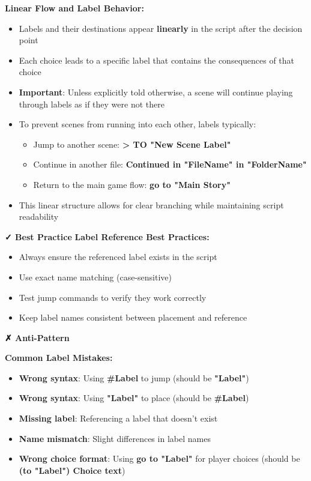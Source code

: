 \documentclass[11pt,letterpaper,oldstylefigures]{memoir}
\newenvironment{AntiPattern}
{\begingroup
\small
\setlength{\parindent}{0pt}
\setlength{\parskip}{0.5em}
\allowdisplaybreaks
\setlength{\displaywidowpenalty}{0}
\setlength{\widowpenalty}{0}
\setlength{\clubpenalty}{0}
\setlength{\interlinepenalty}{0}
\begin{tcolorbox}[
    colback=red!5,
    colframe=red!75!black,
    boxrule=0.5pt,
    arc=2pt,
    left=0.5em,
    right=0.5em,
    top=0.25em,
    bottom=0.25em
]
\textbf{✗ Anti-Pattern}
\end{tcolorbox}\par
}
{\endgroup}
\newcommand{\fountain}[1]{\textbf{#1}}
\begin{document}
\textbf{Linear Flow and Label Behavior:}
\begin{itemize}
\item Labels and their destinations appear \textbf{linearly} in the script after the decision point
\item Each choice leads to a specific label that contains the consequences of that choice
\item \textbf{Important}: Unless explicitly told otherwise, a scene will continue playing through labels as if they were not there
\item To prevent scenes from running into each other, labels typically:
  \begin{itemize}
  \item Jump to another scene: \fountain{> TO "New Scene Label"}
  \item Continue in another file: \fountain{Continued in "FileName" in "FolderName"}
  \item Return to the main game flow: \fountain{go to "Main Story"}
  \end{itemize}
\item This linear structure allows for clear branching while maintaining script readability
\end{itemize}

\textbf{✓ Best Practice}
\textbf{Label Reference Best Practices:}
\begin{itemize}
\item Always ensure the referenced label exists in the script
\item Use exact name matching (case-sensitive)
\item Test jump commands to verify they work correctly
\item Keep label names consistent between placement and reference
\end{itemize}


\begin{AntiPattern}
\textbf{Common Label Mistakes:}
\begin{itemize}
\item \textbf{Wrong syntax}: Using \fountain{\#Label} to jump (should be \fountain{"Label"})
\item \textbf{Wrong syntax}: Using \fountain{"Label"} to place (should be \fountain{\#Label})
\item \textbf{Missing label}: Referencing a label that doesn't exist
\item \textbf{Name mismatch}: Slight differences in label names
\item \textbf{Wrong choice format}: Using \fountain{go to "Label"} for player choices (should be \fountain{(to "Label") Choice text})
\end{itemize}
\end{AntiPattern}
\end{document}
